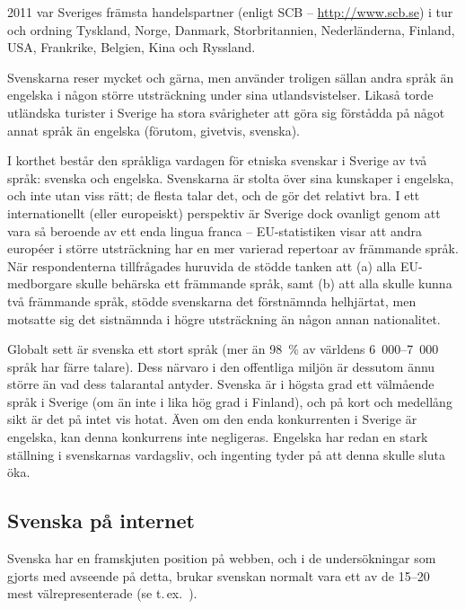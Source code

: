 \begin{multicols}{2}
2011 var Sveriges främsta handelspartner (enligt
SCB -- \url{http://www.scb.se}) i tur och ordning Tyskland, Norge,
Dan\-mark, Storbritannien, Nederländerna, Finland, USA, Frankrike,
Belgien, Kina och Ryssland.

Svenskarna reser mycket och gärna, men använder troligen sällan andra
språk än engelska i någon större utsträckning under sina
utlandsvistelser. Likaså torde utländska turister i Sverige ha stora
svårigheter att göra sig förstådda på något annat språk än engelska
(förutom, givetvis, svenska).

I korthet består den språkliga vardagen för etniska svenskar i Sverige
av två språk: svenska och engelska. Svenskarna är stolta över sina
kunskaper i engelska, och inte utan viss rätt; de flesta talar det,
och de gör det relativt bra. I ett internationellt (eller europeiskt)
perspektiv är Sverige dock ovanligt genom att vara så beroende av ett
enda lingua franca -- EU-statistiken \cite{EC243} visar att andra
européer i större utsträckning har en mer varierad repertoar av
främmande språk. När respondenterna tillfrågades huruvida de stödde
tanken att (a) alla EU-medborgare skulle behärska ett främmande språk,
samt (b) att alla skulle kunna två främmande språk, stödde svenskarna
det förstnämnda helhjärtat, men motsatte sig det sistnämnda i högre
utsträckning än någon annan nationalitet.

Globalt sett är svenska ett stort språk (mer än 98~\% av världens
6~000--7~000 språk har färre talare). Dess närvaro i den offentliga
miljön är dessutom ännu större än vad dess talarantal antyder. Svenska
är i högsta grad ett välmående språk i Sverige (om än inte i lika hög
grad i Finland), och på kort och medellång sikt är det på intet vis
hotat. Även om den enda konkurrenten i Sverige är engelska, kan denna
konkurrens inte negligeras. Engelska har redan en stark ställning i
svenskarnas vardagsliv, och ingenting tyder på att denna skulle sluta
öka.

\subsection{Svenska på internet}

Svenska har en framskjuten position på webben, och i de undersökningar
som gjorts med avseende på detta, brukar svenskan normalt vara ett av
de 15--20 mest välrepresenterade (se
t.\,ex.~\cite[63]{parkvall2006}). 



\end{multicols}
